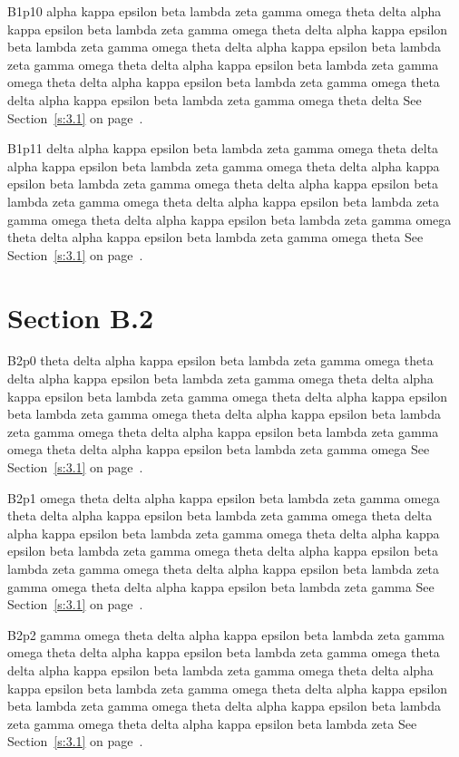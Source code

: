 B1p10 alpha kappa epsilon beta lambda zeta gamma omega theta delta alpha kappa epsilon beta lambda zeta gamma omega theta delta alpha kappa epsilon beta lambda zeta gamma omega theta delta alpha kappa epsilon beta lambda zeta gamma omega theta delta alpha kappa epsilon beta lambda zeta gamma omega theta delta alpha kappa epsilon beta lambda zeta gamma omega theta delta alpha kappa epsilon beta lambda zeta gamma omega theta delta See Section~\ref{s:3.1} on page~\pageref{s:3.1}.

B1p11 delta alpha kappa epsilon beta lambda zeta gamma omega theta delta alpha kappa epsilon beta lambda zeta gamma omega theta delta alpha kappa epsilon beta lambda zeta gamma omega theta delta alpha kappa epsilon beta lambda zeta gamma omega theta delta alpha kappa epsilon beta lambda zeta gamma omega theta delta alpha kappa epsilon beta lambda zeta gamma omega theta delta alpha kappa epsilon beta lambda zeta gamma omega theta See Section~\ref{s:3.1} on page~\pageref{s:3.1}.

\section{Section B.2}\label{s:B.2}
B2p0 theta delta alpha kappa epsilon beta lambda zeta gamma omega theta delta alpha kappa epsilon beta lambda zeta gamma omega theta delta alpha kappa epsilon beta lambda zeta gamma omega theta delta alpha kappa epsilon beta lambda zeta gamma omega theta delta alpha kappa epsilon beta lambda zeta gamma omega theta delta alpha kappa epsilon beta lambda zeta gamma omega theta delta alpha kappa epsilon beta lambda zeta gamma omega See Section~\ref{s:3.1} on page~\pageref{s:3.1}.

B2p1 omega theta delta alpha kappa epsilon beta lambda zeta gamma omega theta delta alpha kappa epsilon beta lambda zeta gamma omega theta delta alpha kappa epsilon beta lambda zeta gamma omega theta delta alpha kappa epsilon beta lambda zeta gamma omega theta delta alpha kappa epsilon beta lambda zeta gamma omega theta delta alpha kappa epsilon beta lambda zeta gamma omega theta delta alpha kappa epsilon beta lambda zeta gamma See Section~\ref{s:3.1} on page~\pageref{s:3.1}.

B2p2 gamma omega theta delta alpha kappa epsilon beta lambda zeta gamma omega theta delta alpha kappa epsilon beta lambda zeta gamma omega theta delta alpha kappa epsilon beta lambda zeta gamma omega theta delta alpha kappa epsilon beta lambda zeta gamma omega theta delta alpha kappa epsilon beta lambda zeta gamma omega theta delta alpha kappa epsilon beta lambda zeta gamma omega theta delta alpha kappa epsilon beta lambda zeta See Section~\ref{s:3.1} on page~\pageref{s:3.1}.

